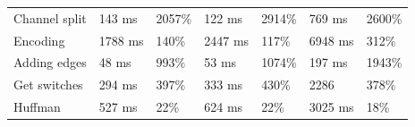 \begin{table}[H]
\begin{tabular}{@{}lllllll@{}}
		Channel split           & 143 ms                                                                                    & 2057\%                                                                         & 122 ms                                                                                     & 2914\%                                                                        & 769 ms                                                                                  & 2600\%                                                                        \\
		Encoding                & 1788 ms                                                                                   & 140\%                                                                          & 2447 ms                                                                                    & 117\%                                                                         & 6948 ms                                                                                 & 312\%                                                                         \\
		Adding edges            & 48 ms                                                                                     & 993\%                                                                          & 53 ms                                                                                      & 1074\%                                                                        & 197 ms                                                                                  & 1943\%                                                                        \\
		Get switches            & 294 ms                                                                                    & 397\%                                                                          & 333 ms                                                                                     & 430\%                                                                         & 2286                                                                                    & 378\%                                                                         \\
		Huffman                 & 527 ms                                                                                    & 22\%                                                                           & 624 ms                                                                                     & 22\%                                                                          & 3025 ms                                                                                 & 18\%                                                                          \\ \midrule

\end{tabular}
\end{table}
